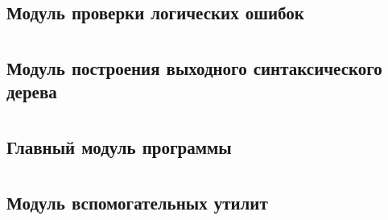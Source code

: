 \documentclass[a4paper,12pt]{report}
\numberwithin{equation}{section}
\begin{document}
\subsection*{Модуль проверки логических ошибок}

\clearpage

\section*{} 
\subsection*{Модуль построения выходного синтаксического дерева}

\clearpage

\section*{} 
\subsection*{Главный модуль программы}

\clearpage

\section*{} 
\subsection*{Модуль вспомогательных утилит}

\clearpage
\end{document}
